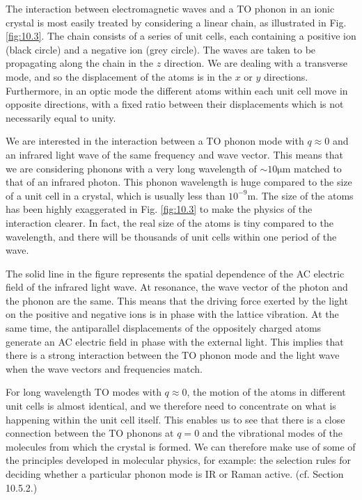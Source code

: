 \documentclass[12pt]{book}
\begin{document}
The interaction between electromagnetic waves and a TO phonon in an ionic crystal is most easily treated by considering a linear chain, as illustrated in Fig. \ref{fig:10.3}. The chain consists of a series of unit cells, each containing a positive ion (black circle) and a negative ion (grey circle). The waves are taken to be propagating along the chain in the $z$ direction. We are dealing with a transverse mode, and so the displacement of the atoms is in the $x$ or $y$ directions. Furthermore, in an optic mode the different atoms within each unit cell move  in opposite directions, with a fixed ratio between their displacements which is not necessarily equal to unity.

We are interested in the interaction between a TO phonon mode with $q\approx0$ and an infrared light wave of the same frequency and wave vector. This means that we are considering phonons with a very long wavelength of $\sim\mathrm{10\mu m}$ matched to that of an infrared photon. This phonon wavelength is huge compared to the size of a unit cell in a crystal, which is usually less than $\mathrm{10^{-9}m}$. The size of the atoms has been highly exaggerated in Fig. \ref{fig:10.3} to make the physics of the interaction clearer. In fact, the real size of the atoms is tiny compared to the wavelength, and there will be thousands of unit cells within one period of the wave.

The solid line in the figure represents the spatial dependence of the AC electric field of the infrared light wave. At resonance, the wave vector of the photon and the phonon are the same. This means that the driving force exerted by the light on the positive and negative ions is in phase with the lattice vibration. At the same time, the antiparallel displacements of the oppositely charged atoms generate an AC electric field in phase with the external light. This implies that there is a strong interaction between the TO phonon mode and the light wave when the wave vectors and frequencies match.

For long wavelength TO modes with $q\approx0$, the motion of the atoms in different unit cells is almost identical, and we therefore need to concentrate on what is happening within the unit cell itself. This enables us to see that there is a close connection between the TO phonons at $q = 0$ and the vibrational modes of the molecules from which the crystal is formed. We can therefore make use of some of the principles developed in molecular physics, for example: the selection rules for deciding whether a particular phonon mode is IR or Raman active. (cf. Section 10.5.2.)
\end{document}
